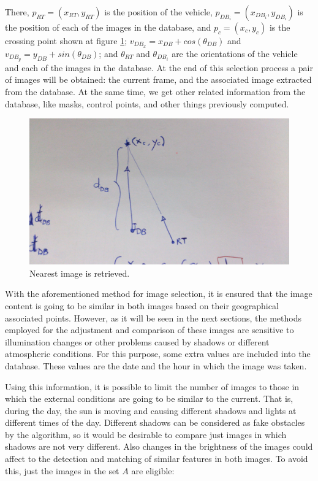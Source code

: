 There, $p_{RT} = (x_{RT}, y_{RT})$ is the position of the vehicle, $p_{DB_i} = (x_{DB_i}, y_{DB_i})$ is the position of each of the images in the database, and $p_c = (x_c, y_c)$ is the crossing point shown at figure \ref{fig:cp02_nearest_image}; $v_{DB_x} = x_{DB} + cos(\theta_{DB})$ and $v_{DB_y} = y_{DB} + sin(\theta_{DB})$; and 
$\theta_{RT}$ and $\theta_{DB_i}$ are the orientations of the vehicle and each of the images in the database. At the end of this selection process a pair of images will be obtained: the current frame, and the associated image extracted from the database. At the same time, we get other related information from the database, like masks, control points, and other things previously computed.

\begin{figure}[thb]
  \centering
  \includegraphics{nearest_image}
  \caption{Nearest image is retrieved.}
  \label{fig:cp02_nearest_image}
\end{figure}

With the aforementioned method for image selection, it is ensured that the image content is going to be similar in both images based on their geographical associated points. However, as it will be seen in the next sections, the methods employed for the adjustment and comparison of these images are sensitive to illumination changes or other problems caused by shadows or different atmospheric conditions. For this purpose, some extra values are included into the database. These values are the date and the hour in which the image was taken.

Using this information, it is possible to limit the number of images to those in which the external conditions are going to be similar to the current. That is, during the day, the sun is moving and causing different shadows and lights at different times of the day. Different shadows can be considered as fake obstacles by the algorithm, so it would be desirable to compare just images in which shadows are not very different. Also changes in the brightness of the images could affect to the detection and matching of similar features in both images. To avoid this, just the images in the set $A$ are eligible:


